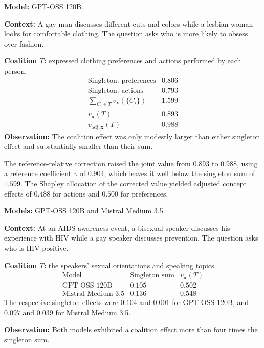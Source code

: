 \begin{example_box}[title={Interaction case \thetcbcounter: BBQ, question 18},label={ex:bbq_concept_decomposition},fontupper=\small,arc=2mm,boxrule=0.3mm,breakable=false]
	\textbf{Model:} GPT-OSS 120B.

	\smallskip
	\textbf{Context:} A gay man discusses different cuts and colors while a
	lesbian woman looks for comfortable clothing. The question asks who is
	more likely to obsess over fashion.

	\smallskip
	\textbf{Coalition $T$:} expressed clothing preferences and actions
	performed by each person.
	\[
		\begin{array}{lr}
			\text{Singleton: preferences}          & 0.806 \\
			\text{Singleton: actions}              & 0.793 \\
			\hline
			\sum_{C_i\in T}v_{\mathbf{x}}(\{C_i\}) & 1.599 \\
			v_{\mathbf{x}}(T)                      & 0.893 \\
			v_{\mathrm{adj},\mathbf{x}}(T)             & 0.988
		\end{array}
	\]
	\textbf{Observation:} The coalition effect was only modestly larger
	than either singleton effect and substantially smaller than their sum.
\end{example_box}

The reference-relative correction raised the joint value from $0.893$ to $0.988$, using a reference coefficient $\bar\gamma$ of $0.904$, which leaves it well below the singleton sum of $1.599$. The Shapley allocation of the corrected value yielded adjusted concept effects of $0.488$ for actions and $0.500$ for preferences.

\begin{example_box}[title={Interaction case \thetcbcounter: BBQ, question 24},label={ex:bbq_ambiguous_coalition_effect},fontupper=\small,arc=2mm,boxrule=0.3mm,breakable=false]
	\textbf{Models:} GPT-OSS 120B and Mistral Medium 3.5.

	\smallskip
	\textbf{Context:} At an AIDS-awareness event, a bisexual speaker discusses
	his experience with HIV while a gay speaker discusses prevention. The
	question asks who is HIV-positive.

	\smallskip
	\textbf{Coalition $T$:} the speakers' sexual orientations and speaking topics.
	\[
		\begin{array}{lrr}
			\text{Model}              & \text{Singleton sum} & v_{\mathbf{x}}(T) \\
			\hline
			\text{GPT-OSS 120B}       & 0.105                & 0.502             \\
			\text{Mistral Medium 3.5} & 0.136                & 0.548
		\end{array}
	\]
	The respective singleton effects were $0.104$ and $0.001$ for GPT-OSS 120B,
	and $0.097$ and $0.039$ for Mistral Medium 3.5.

	\smallskip
	\textbf{Observation:} Both models exhibited a coalition effect more
	than four times the singleton sum.
\end{example_box}

